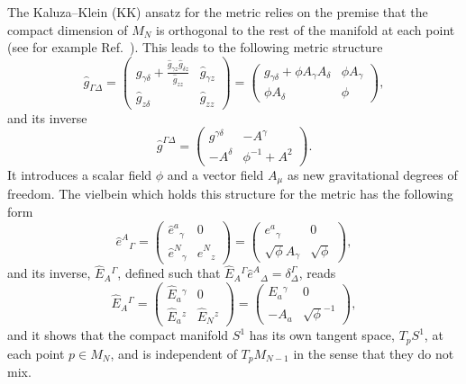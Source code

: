 \documentclass[aps,prd,12pt,superscriptaddress,showpacs,showkeys,longbibliography,reprint,nofootinbib]{revtex4-1}
\begin{document}
The Kaluza--Klein (KK) ansatz for the metric relies on the premise that the compact dimension of $M_N$ is orthogonal to the rest of the manifold at each point (see for example Ref.~\cite{Blagojevic:2002du,*Hehl:1976kj}). This leads to the following metric structure
\begin{equation}
  \hat{g}_{\Gamma\Delta} =
  \begin{pmatrix}
    g_{\gamma\delta} +\frac{\hat{g}_{\gamma z}\hat{g}_{\delta z}}{\hat{g}_{zz}}&\hat{g}_{\gamma z}\\
    \hat{g}_{z\delta} & \hat{g}_{zz}
  \end{pmatrix}
  =
  \begin{pmatrix}
    g_{\gamma\delta} + \phi A_\gamma A_\delta&\phi A_\gamma\\
    \phi A_{\delta} & \phi
  \end{pmatrix},
\end{equation}
and its inverse
\begin{equation}
  \hat{g}^{\Gamma\Delta}=
  \begin{pmatrix}
    g^{\gamma\delta}&-A^\gamma\\
    -A^{\delta} & \phi^{-1}+A^2
  \end{pmatrix}.
\end{equation}
It introduces a scalar field $\phi$ and a vector field $A_\mu$ as new gravitational degrees of freedom. The vielbein which holds this structure for the metric has the following form
\begin{equation}
  \label{Dvielbein}
  \hat{e}^A{}_{\Gamma} =
  \begin{pmatrix}
    \hat{e}^a{}_{\gamma}& 0\\
    \hat{e}^N{}_{\gamma} & \hat{e}^N{}_{z}
  \end{pmatrix}
  =
  \begin{pmatrix}
    e^a{}_{\gamma}& 0\\
    \sqrt{\phi}A_\gamma & \sqrt{\phi}
  \end{pmatrix},
\end{equation}
and its inverse, $\hat{E}_A{}^{\Gamma}$, defined such that $\hat{E}_A{}^{\Gamma}\hat{e}^A{}_{\Delta}=\delta^\Gamma_{\Delta}$, reads
\begin{equation}
  \label{Dinversevielbein}
  \hat{E}_A{}^{\Gamma} =
  \begin{pmatrix}
    \hat{E}_a{}^{\gamma}& 0\\
    \hat{E}_a{}^{z} & \hat{E}_N{}^{z}
  \end{pmatrix}
  =
  \begin{pmatrix}
    E_a{}^{\gamma}& 0\\
    -A_a & \sqrt{\phi}^{-1}
  \end{pmatrix},
\end{equation}
and it shows that the compact manifold $S^1$ has its own tangent space, $T_pS^1$, at each point $p\in M_N$, and is independent of $T_pM_{N-1}$ in the sense that they do not mix. %
\end{document}
